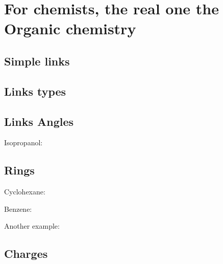 \documentclass{article}
\begin{document}
\section{For chemists, the real one the Organic chemistry}

\subsection{Simple links}


\subsection{Links types}




\subsection{Links Angles}



Isopropanol:


\subsection{Rings}

Cyclohexane:


Benzene:


Another example:


\subsection{Charges}



\end{document}

